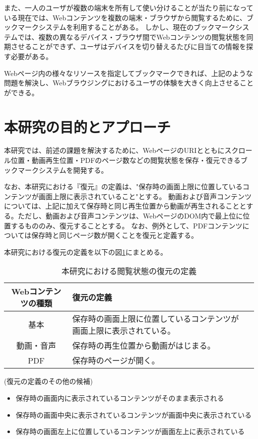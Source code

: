 また、一人のユーザが複数の端末を所有して使い分けることが当たり前になっている現在では、Webコンテンツを複数の端末・ブラウザから閲覧するために、ブックマークシステムを利用することがある。
しかし、現在のブックマークシステムでは、複数の異なるデバイス・ブラウザ間でWebコンテンツの閲覧状態を同期させることができず、ユーザはデバイスを切り替えるたびに目当ての情報を探す必要がある。

Webページ内の様々なリソースを指定してブックマークできれば、上記のような問題を解決し、Webブラウジングにおけるユーザの体験を大きく向上させることができる。

\section{本研究の目的とアプローチ}
本研究では、前述の課題を解決するために、WebページのURIとともにスクロール位置・動画再生位置・PDFのページ数などの閲覧状態を保存・復元できるブックマークシステムを開発する。

なお、本研究における『復元』の定義は、"保存時の画面上限に位置しているコンテンツが画面上限に表示されていること"とする。
動画および音声コンテンツについては、上記に加えて保存時と同じ再生位置から動画が再生されることとする。ただし、動画および音声コンテンツは、WebページのDOM内で最上位に位置するもののみ、復元することとする。
なお、例外として、PDFコンテンツについては保存時と同じページ数が開くことを復元と定義する。

本研究における復元の定義を以下の図\ref{tb:restore-definition}にまとめる。

\begin{table}[htbp]
  \begin{center}
    \caption{本研究における閲覧状態の復元の定義}
    \label{tb:restore-definition}
    \begin{tabular}{|c|l|l|}
      \hline
      Webコンテンツの種類 & 復元の定義 \\\hline\hline
      基本 & 保存時の画面上限に位置しているコンテンツが画面上限に表示されている。 \\\hline
      動画・音声 & 保存時の再生位置から動画がはじまる。 \\\hline
      PDF & 保存時のページが開く。 \\\hline
    \end{tabular}
  \end{center}
\end{table}

(復元の定義のその他の候補)

\begin{itemize}
  \item 保存時の画面内に表示されているコンテンツがそのまま表示される
  \item 保存時の画面中央に表示されているコンテンツが画面中央に表示されている
  \item 保存時の画面左上に位置しているコンテンツが画面左上に表示されている
\end{itemize}

